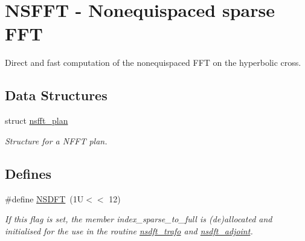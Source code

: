 \hypertarget{group__nsfft}{
\section{NSFFT - Nonequispaced sparse FFT}
\label{group__nsfft}
}
Direct and fast computation of the nonequispaced FFT on the hyperbolic cross.  
\subsection*{Data Structures}
\begin{CompactItemize}
\item 
struct \hyperlink{structnsfft__plan}{nsfft\_\-plan}
\begin{CompactList}\small\item\em Structure for a NFFT plan. \item\end{CompactList}\end{CompactItemize}
\subsection*{Defines}
\begin{CompactItemize}
\item 
\#define \hyperlink{group__nsfft_ga8}{NSDFT}~(1U$<$$<$ 12)
\begin{CompactList}\small\item\em If this flag is set, the member index\_\-sparse\_\-to\_\-full is (de)allocated and initialised for the use in the routine \hyperlink{group__nsfft_ga0}{nsdft\_\-trafo} and \hyperlink{group__nsfft_ga1}{nsdft\_\-adjoint}. \item\end{CompactList}\end{CompactItemize}
